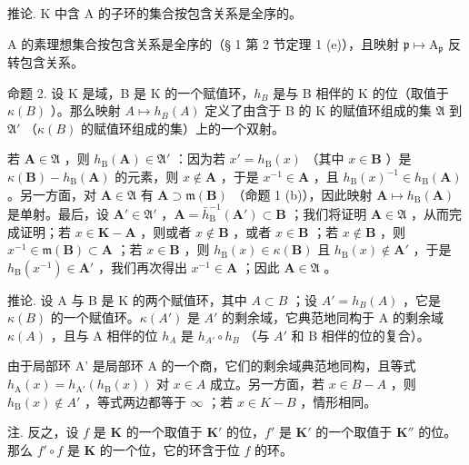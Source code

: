 推论. K 中含 A 的子环的集合按包含关系是全序的。

A 的素理想集合按包含关系是全序的（§ 1 第 2 节定理 1 (e)），且映射 \(\mathfrak{p} \mapsto \mathrm{A}_{\mathfrak{p}}\) 反转包含关系。

命题 2. 设 K 是域，B 是 K 的一个赋值环，\(h_B\) 是与 B 相伴的 K 的位（取值于 \(\kappa(B)\) ）。那么映射 \(A \mapsto h_B(A)\) 定义了由含于 B 的 K 的赋值环组成的集 \(\mathfrak{A}\) 到 \(\mathfrak{A}'\) （\(\kappa(B)\) 的赋值环组成的集）上的一个双射。

若 \(\mathbf{A} \in \mathfrak{A}\) ，则 \(h_{\mathrm{B}}(\mathbf{A}) \in \mathfrak{A}'\) ：因为若 \(x' = h_{\mathrm{B}}(x)\) （其中 \(x \in \mathbf{B}\) ）是 \(\kappa(\mathbf{B}) - h_{\mathrm{B}}(\mathbf{A})\) 的元素，则 \(x \notin \mathbf{A}\) ，于是 \(x^{-1} \in \mathbf{A}\) ，且 \(h_{\mathrm{B}}(x)^{-1} \in h_{\mathrm{B}}(\mathbf{A})\) 。另一方面，对 \(\mathbf{A} \in \mathfrak{A}\) 有 \(\mathbf{A} \supset \mathfrak{m}(\mathbf{B})\) （命题 1 (b)），因此映射 \(\mathbf{A} \mapsto h_{\mathrm{B}}(\mathbf{A})\) 是单射。最后，设 \(\mathbf{A}' \in \mathfrak{A}'\) ，\(\mathbf{A} = \bar{h}_{\mathrm{B}}^{-1}(\mathbf{A}') \subset \mathbf{B}\) ；我们将证明 \(\mathbf{A} \in \mathfrak{A}\) ，从而完成证明；若 \(x \in \mathbf{K} - \mathbf{A}\) ，则或者 \(x \notin \mathbf{B}\) ，或者 \(x \in \mathbf{B}\) ；若 \(x \notin \mathbf{B}\) ，则 \(x^{-1} \in \mathfrak{m}(\mathbf{B}) \subset \mathbf{A}\) ；若 \(x \in \mathbf{B}\) ，则 \(h_{\mathrm{B}}(x) \in \kappa(\mathbf{B})\) 且 \(h_{\mathrm{B}}(x) \notin \mathbf{A}'\) ，于是 \(h_{\mathrm{B}}(x^{-1}) \in \mathbf{A}'\) ，我们再次得出 \(x^{-1} \in \mathbf{A}\) ；因此 \(\mathbf{A} \in \mathfrak{A}\) 。

推论. 设 A 与 B 是 K 的两个赋值环，其中 \(A \subset B\) ；设 \(A' = h_{B}(A)\) ，它是 \(\kappa(B)\) 的一个赋值环。\(\kappa(A')\) 是 \(A'\) 的剩余域，它典范地同构于 A 的剩余域 \(\kappa(A)\) ，且与 A 相伴的位 \(h_{A}\) 是 \(h_{A'} \circ h_{B}\) （与 \(A'\) 和 B 相伴的位的复合）。

由于局部环 A' 是局部环 A 的一个商，它们的剩余域典范地同构，且等式 \(h_{\mathrm{A}}(x) = h_{\mathrm{A}'}(h_{\mathrm{B}}(x))\) 对 \(x \in A\) 成立。另一方面，若 \(x \in B - A\) ，则 \(h_{\mathrm{B}}(x) \notin A'\) ，等式两边都等于 \(\infty\) ；若 \(x \in K - B\) ，情形相同。

注. 反之，设 \(f\) 是 \(\mathbf{K}\) 的一个取值于 \(\mathbf{K}'\) 的位，\(f'\) 是 \(\mathbf{K}'\) 的一个取值于 \(\mathbf{K}''\) 的位。那么 \(f' \circ f\) 是 \(\mathbf{K}\) 的一个位，它的环含于位 \(f\) 的环。

